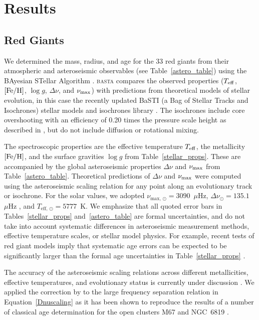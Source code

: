 \documentclass[modern]{aastex62}
\newcommand{\numax}{\mbox{$\nu_{\rm max}$}\xspace}
\newcommand{\Dnu}{\mbox{$\Delta \nu$}\xspace}
\newcommand{\teff}{\mbox{$T_{\rm eff}$}\xspace}
\newcommand{\logg}{\mbox{$\log g$}\xspace}
\newcommand{\feh}{\mbox{$\rm{[Fe/H]}$}\xspace}
\begin{document}




\section{Results}
\label{targets}

\subsection{Red Giants}
\label{rgs}

We determined the mass, radius, and age for the 33 red giants from their atmospheric and asteroseismic observables (see Table~\ref{astero_table}) using the BAyesian STellar Algorithm \citep[\textsc{basta}][]{silvaaguirre2015,silvaaguirre2017}. \textsc{basta} compares the observed properties (\teff, \feh, \logg, \Dnu, and \numax) with predictions from theoretical models of stellar evolution, in this case the recently updated BaSTI (a Bag of Stellar Tracks and Isochrones) stellar models and isochrones library \citep{Hidalgo:2018dy}. The isochrones include core overshooting with an efficiency of 0.20 times the pressure scale height as described in \citet{Hidalgo:2018dy}, but do not include diffusion or rotational mixing.

The spectroscopic properties are the effective temperature \teff, the metallicity \feh, and the surface gravities \logg from Table~\ref{stellar_props}. These are accompanied by the global asteroseismic properties \Dnu and \numax from Table~\ref{astero_table}. Theoretical predictions of \Dnu and \numax were computed using the asteroseismic scaling relation for any point along an evolutionary track or isochrone. For the solar values, we adopted $\nu_{\text{max, }\odot}=3090$~$\mu$Hz, $\Delta\nu_{\odot}=135.1$~$\mu$Hz \citep{huber2011}, and $T_{\text{eff, }\odot}=5777$~K. We emphasize that all quoted error bars in Tables~\ref{stellar_props} and~\ref{astero_table} are formal uncertainties, and do not take into account systematic differences in asteroseismic measurement methods, effective temperature scales, or stellar model physics. For example, recent tests of red giant models imply that systematic age errors can be expected to be significantly larger than the formal age uncertainties in Table~\ref{stellar_props} \citep{Tayar2017}.

The accuracy of the asteroseismic scaling relations across different metallicities, effective temperatures, and evolutionary status is currently under discussion \citep[see][]{white2011,belkacem2011,sharma2016,viani2017}.
We applied the correction by \cite{Serenelli:2017cn} to the large frequency separation relation in Equation~\ref{Dnuscaling} as it has been shown to reproduce the results of a number of classical age determination for the open clusters M67 \citep{stello2016} and NGC~6819 \citep{casagrande2016}.
\end{document}
